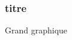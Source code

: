 \documentclass[french,9pt]{beamer}
\begin{document}
\begin{frame}
    \frametitle{titre}
    Grand graphique
\end{frame}
\end{document}
